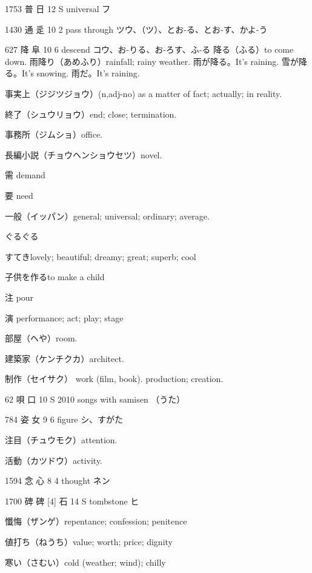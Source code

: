 1753	普		日	12	S		universal	フ

1430	通		辵	10	2		pass through	ツウ、（ツ）、とお-る、とお-す、かよ-う

627	降		阜	10	6		descend	コウ、お-りる、お-ろす、ふ-る
降る（ふる）to come down.
雨降り（あめふり）rainfall; rainy weather.
雨が降る。It's raining.
雪が降る。It's snowing.
雨だ。It's raining.

事実上（ジジツジョウ）(n,adj-no)
as a matter of fact; actually; in reality.

終了（シュウリョウ）end; close; termination.

事務所（ジムショ）office.

長編小説（チョウヘンショウセツ）novel.

需 demand

要 need

一般（イッパン）general; universal; ordinary; average.

ぐるぐる

すてきlovely; beautiful; dreamy; great; superb; cool


子供を作るto make a child

注 pour

演 performance; act; play; stage

部屋（へや）room.

建築家（ケンチクカ）architect.

制作（セイサク）
work (film, book).
production; creation.

62	唄		口	10	S	2010	songs with samisen	（うた）

784	姿		女	9	6		figure	シ、すがた

注目（チュウモク）attention.

活動（カツドウ）activity.

1594	念		心	8	4		thought	ネン

1700	碑	碑 [4]	石	14	S		tombstone	ヒ

懺悔（ザンゲ）repentance; confession; penitence

値打ち（ねうち）value; worth; price; dignity

寒い（さむい）cold (weather; wind); chilly
